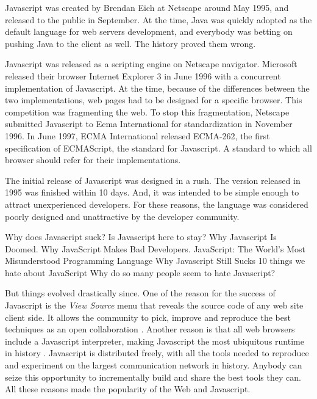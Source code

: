 Javascript was created by Brendan Eich at Netscape around May 1995, and released to the public in September.
At the time, Java was quickly adopted as the default language for web servers development, and everybody was betting on pushing Java to the client as well.
The history proved them wrong.

Javascript was released as a scripting engine on Netscape navigator.
Microsoft released their browser Internet Explorer 3 in June 1996 with a concurrent implementation of Javascript.
At the time, because of the differences between the two implementations, web pages had to be designed for a specific browser.
This competition was fragmenting the web.
To stop this fragmentation, Netscape submitted Javascript to Ecma International for standardization in November 1996.
In June 1997, ECMA International released ECMA-262, the first specification of ECMAScript, the standard for Javascript.
A standard to which all browser should refer for their implementations.

The initial release of Javascript was designed in a rush. The version released in 1995 was finished within 10 days.
And, it was intended to be simple enough to attract unexperienced developers.
For these reasons, the language was considered poorly designed and unattractive by the developer community.


{
\fontsize{10pt}{10pt}\selectfont
Why does Javascript suck?
Is Javascript here to stay?
Why Javascript Is Doomed.
Why JavaScript Makes Bad Developers.
JavaScript: The World's Most Misunderstood Programming Language
Why Javascript Still Sucks
10 things we hate about JavaScript
Why do so many people seem to hate Javascript?
}

But things evolved drastically since.
One of the reason for the success of Javascript is the \textit{View Source} menu that reveals the source code of any web site client side.
It allows the community to pick, improve and reproduce the best techniques as an open collaboration .
Another reason is that all web browsers include a Javascript interpreter, making Javascript the most ubiquitous runtime in history \cite{Flanagan2006}.
Javascript is distributed freely, with all the tools needed to reproduce and experiment on the largest communication network in history.
Anybody can seize this opportunity to incrementally build and share the best tools they can.
All these reasons made the popularity of the Web and Javascript.

